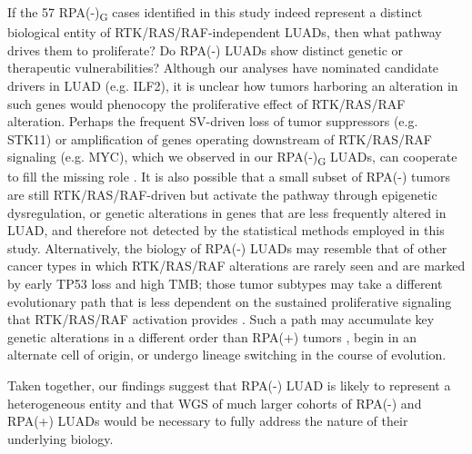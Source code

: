 \documentclass[phd,tocprelim]{cornell}
\begin{document}
If the 57 RPA(-)\textsubscript{G} cases identified in this study indeed represent a distinct biological entity of RTK/RAS/RAF-independent LUADs, then what pathway drives them to proliferate? Do RPA(-) LUADs show distinct genetic or therapeutic vulnerabilities? Although our analyses have nominated candidate drivers in LUAD (e.g. ILF2), it is unclear how tumors harboring an alteration in such genes would phenocopy the proliferative effect of RTK/RAS/RAF alteration. Perhaps the frequent SV-driven loss of tumor suppressors (e.g. STK11) or amplification of genes operating downstream of RTK/RAS/RAF signaling (e.g. MYC), which we observed in our RPA(-)\textsubscript{G} LUADs, can cooperate to fill the missing role \cite{Sears2000-ua}
. It is also possible that a small subset of RPA(-) tumors are still RTK/RAS/RAF-driven but activate the pathway through epigenetic dysregulation, or genetic alterations in genes that are less frequently altered in LUAD, and therefore not detected by the statistical methods employed in this study. Alternatively, the biology of RPA(-) LUADs may resemble that of other cancer types in which RTK/RAS/RAF alterations are rarely seen and are marked by early TP53 loss and high TMB; those tumor subtypes may take a different evolutionary path that is less dependent on the sustained proliferative signaling that RTK/RAS/RAF activation provides \cite{Chen2019-bi,Drosten2014-el,Salgueiro2020-xg}. Such a path may accumulate key genetic alterations in a different order than RPA(+) tumors \cite{Lee2019-nm}, begin in an alternate cell of origin, or undergo lineage switching in the course of evolution.

Taken together, our findings suggest that RPA(-) LUAD is likely to represent a heterogeneous entity and that WGS of much larger cohorts of RPA(-) and RPA(+) LUADs would be necessary to fully address the nature of their underlying biology.

\end{document}
